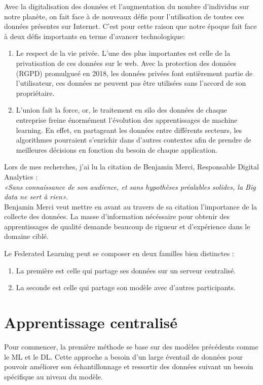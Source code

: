 \documentclass[12pt,a4paper]{report}
\begin{document}
Avec la digitalisation des données et l'augmentation du nombre d'individus sur notre planète, on fait face à de nouveaux défis pour l'utilisation de toutes ces données présentes sur Internet. C'est pour cette raison que notre époque fait face à deux défis importants en terme d'avancer technologique: \\
\begin{enumerate}
\item Le respect de la vie privée. L'une des plus importantes est celle de la privatisation de ces données sur le web. Avec la protection des données (RGPD) promulgueé en 2018, les données privées font entièrement partie de l'utilisateur, ces données ne peuvent pas être utilisées sans l'accord de son propriétaire.
\item L'union fait la force, or, le traitement en silo des données de chaque entreprise freine énormément l'évolution des apprentissages de machine learning. En effet, en partageant les données entre différents secteurs, les algorithmes pourraient s'enrichir dans d'autres contextes afin de prendre de meilleures décisions en fonction du besoin de chaque application.
\end{enumerate}
Lors de mes recherches, j'ai lu la citation de Benjamin Merci, Responsable Digital Analytics : \\
\textit{«Sans connaissance de son audience, et sans hypothèses préalables solides, la Big data ne sert à rien».}\\
Benjamin Merci veut mettre en avant au travers de sa citation l'importance de la collecte des données. La masse d'information nécéssaire pour obtenir des apprentissages de qualité demande beaucoup de rigueur et d'expérience dans le domaine ciblé.\\
\pagebreak

Le Federated Learning peut se composer en deux familles bien distinctes :
\begin{enumerate}
\item La première est celle qui partage ses données sur un serveur centralisé.
\item La seconde est celle qui partage son modèle avec d'autres participants.
\end{enumerate}

\section{Apprentissage centralisé}

Pour commencer, la première méthode se base sur des modèles précédents comme le ML et le DL. Cette approche a besoin d'un large éventail de données pour pouvoir améliorer son échantillonnage et ressortir des données suivant un besoin spécifique au niveau du modèle.\\
\end{document}

